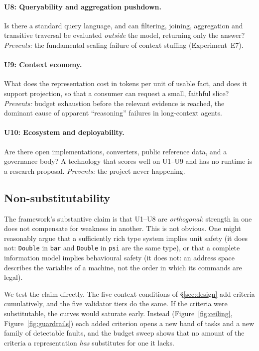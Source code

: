 \paragraph{U8: Queryability and aggregation pushdown.}
Is there a standard query language, and can filtering, joining, aggregation and
transitive traversal be evaluated \emph{outside} the model, returning only the
answer? \emph{Prevents:} the fundamental scaling failure of context stuffing
(Experiment~E7).

\paragraph{U9: Context economy.}
What does the representation cost in tokens per unit of usable fact, and does
it support projection, so that a consumer can request a small, faithful slice?
\emph{Prevents:}
budget exhaustion before the relevant evidence is reached, the dominant cause of
apparent ``reasoning'' failures in long-context agents.

\paragraph{U10: Ecosystem and deployability.}
Are there open implementations, converters, public reference data, and a
governance body? A technology that scores well on U1--U9 and has no runtime is a
research proposal. \emph{Prevents:} the project never happening.

\subsection{Non-substitutability}

The framework's substantive claim is that U1--U8 are \emph{orthogonal}: strength
in one does not compensate for weakness in another. This is not obvious. One
might reasonably argue that a sufficiently rich type system implies unit safety
(it does not: \texttt{Double} in \texttt{bar} and \texttt{Double} in \texttt{psi}
are the same type), or that a complete information model implies behavioural
safety (it does not: an \opcua{} address space describes the variables of a
machine, not the order in which its commands are legal).

We test the claim directly. The five context conditions of \S\ref{sec:design}
add criteria cumulatively, and the five validator tiers do the same. If the
criteria were substitutable, the curves would saturate early. Instead
(Figure~\ref{fig:ceiling}, Figure~\ref{fig:guardrails}) each added criterion
opens a new band of tasks and a new family of detectable faults, and the
budget sweep shows that no amount of the criteria a representation \emph{has}
substitutes for one it lacks.

